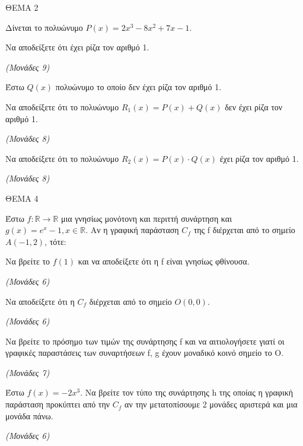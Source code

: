\documentclass[11pt,a4paper,twoside]{book}
\newcommand{\monades}[1]{\hfill \textit{(Μονάδες #1)}}
\begin{document}
ΘΕΜΑ 2

Δίνεται το πολυώνυμο $P(x) = 2x^3 - 8x^2 + 7x - 1$.

\begin{alist}
\item Να αποδείξετε ότι έχει ρίζα τον αριθμό 1.

\monades{9}

\item Έστω $Q(x)$ πολυώνυμο το οποίο δεν έχει ρίζα τον αριθμό 1.

\end{alist}
\begin{alist}
\item
  Να αποδείξετε ότι το πολυώνυμο $R_1(x) = P(x) + Q(x)$ δεν έχει ρίζα τον αριθμό 1.

\monades{8}


\end{alist}
\begin{alist}
\item
  Να αποδείξετε ότι το πολυώνυμο $R_2(x) = P(x) \cdot Q(x)$ έχει ρίζα τον αριθμό 1.

\monades{8}
\end{alist}

\vspace{4mm}

ΘΕΜΑ 4

Έστω $f: \mathbb{R} \to \mathbb{R}$ μια γνησίως μονότονη και περιττή συνάρτηση και $g(x) = e^x - 1, x \in \mathbb{R}$. Αν η γραφική παράσταση $C_f$ της f διέρχεται από το σημείο $A(-1, 2)$, τότε:

\begin{alist}
\item Να βρείτε το $f(1)$ και να αποδείξετε ότι η f είναι γνησίως φθίνουσα.

\monades{6}

\item Να αποδείξετε ότι η $C_f$ διέρχεται από το σημείο $O(0, 0)$.

\monades{6}

\item Να βρείτε το πρόσημο των τιμών της συνάρτησης f και να αιτιολογήσετε γιατί οι γραφικές παραστάσεις των συναρτήσεων f, g έχουν μοναδικό κοινό σημείο το Ο.

\monades{7}

\item Έστω $f(x) = -2x^3$. Να βρείτε τον τύπο της συνάρτησης h της οποίας η γραφική παράσταση προκύπτει από την $C_f$ αν την μετατοπίσουμε 2 μονάδες αριστερά και μια μονάδα πάνω.

\monades{6}
\end{alist}
\end{document}
